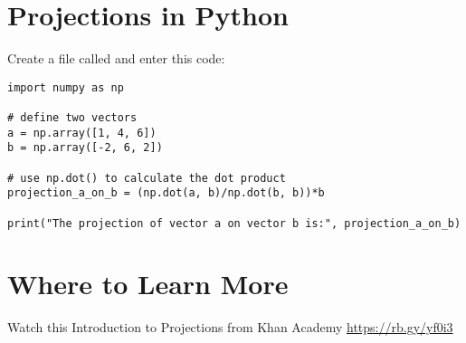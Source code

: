 \section{Projections in Python}

Create a file called  and enter this code:
\begin{Verbatim}
import numpy as np

# define two vectors  
a = np.array([1, 4, 6])   
b = np.array([-2, 6, 2])  
  
# use np.dot() to calculate the dot product
projection_a_on_b = (np.dot(a, b)/np.dot(b, b))*b
  
print("The projection of vector a on vector b is:", projection_a_on_b)
\end{Verbatim}
 
\section{Where to Learn More}

Watch this Introduction to Projections from Khan Academy 
\url{https://rb.gy/yf0i3}

